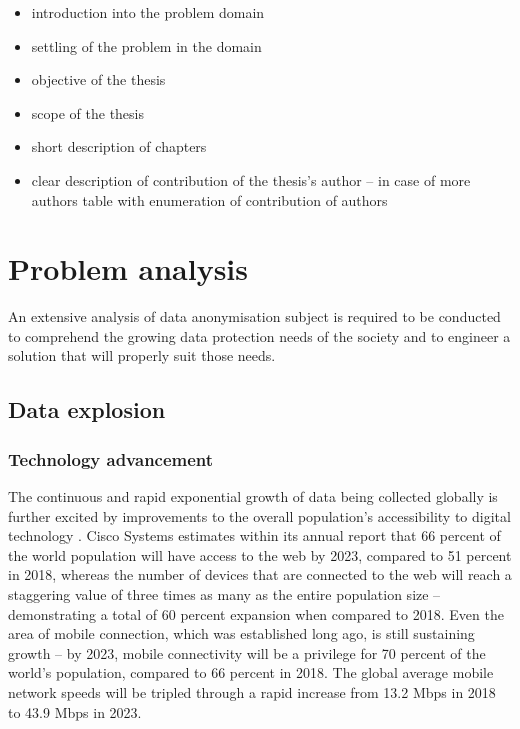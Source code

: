 \documentclass[a4paper,twoside,12pt]{book}
\begin{document}
\begin{itemize}
\item introduction into the problem domain
\item settling of the problem in the domain
\item objective of the thesis 
\item scope of the thesis
\item short description of chapters
\item clear description of contribution of the thesis's author – in case of more authors table with enumeration of contribution of authors
\end{itemize}



\chapter{Problem analysis}

An extensive analysis of data anonymisation subject is required to be conducted to comprehend the growing data protection needs of the society and to engineer a solution that will properly suit those needs.

\section{Data explosion}

\subsection{Technology advancement}
The continuous and rapid exponential growth of data being collected globally is further excited by improvements to the overall population's accessibility to digital technology \cite{bib:big_data_analytics}. Cisco Systems estimates within its annual report \cite{bib:cisco_annual} that 66 percent of the world population will have access to the web by 2023, compared to 51 percent in 2018, whereas the number of devices that are connected to the web will reach a staggering value of three times as many as the entire population size – demonstrating a total of 60 percent expansion when compared to 2018. Even the area of mobile connection, which was established long ago, is still sustaining growth – by 2023, mobile connectivity will be a privilege for 70 percent of the world's population, compared to 66 percent in 2018. The global average mobile network speeds will be tripled through a rapid increase from 13.2 Mbps in 2018 to 43.9 Mbps in 2023.
\end{document}
